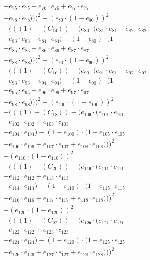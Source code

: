 \documentclass[10pt, a4paper]{article}
\begin{document}
\begin{align*}
& + e_{75} \cdot e_{75} + e_{76} \cdot e_{76} + e_{77} \cdot e_{77} \\
& + e_{78} \cdot e_{78})))^{2} + (e_{80} \cdot (1 - e_{80}))^{2} \\
& + (((1) - (C_{14})) - (e_{80} \cdot (e_{81} \cdot e_{81} + e_{82} \cdot e_{82} \\
& + e_{83} \cdot e_{83} + e_{84} \cdot e_{84}) - (1 - e_{80}) \cdot (1 \\
& + e_{85} \cdot e_{85} + e_{86} \cdot e_{86} + e_{87} \cdot e_{87} \\
& + e_{88} \cdot e_{88})))^{2} + (e_{90} \cdot (1 - e_{90}))^{2} \\
& + (((1) - (C_{16})) - (e_{90} \cdot (e_{91} \cdot e_{91} + e_{92} \cdot e_{92} \\
& + e_{93} \cdot e_{93} + e_{94} \cdot e_{94}) - (1 - e_{90}) \cdot (1 \\
& + e_{95} \cdot e_{95} + e_{96} \cdot e_{96} + e_{97} \cdot e_{97} \\
& + e_{98} \cdot e_{98})))^{2} + (e_{100} \cdot (1 - e_{100}))^{2} \\
& + (((1) - (C_{18})) - (e_{100} \cdot (e_{101} \cdot e_{101} \\
& + e_{102} \cdot e_{102} + e_{103} \cdot e_{103} \\
& + e_{104} \cdot e_{104}) - (1 - e_{100}) \cdot (1 + e_{105} \cdot e_{105} \\
& + e_{106} \cdot e_{106} + e_{107} \cdot e_{107} + e_{108} \cdot e_{108})))^{2} \\
& + (e_{110} \cdot (1 - e_{110}))^{2} \\
& + (((1) - (C_{20})) - (e_{110} \cdot (e_{111} \cdot e_{111} \\
& + e_{112} \cdot e_{112} + e_{113} \cdot e_{113} \\
& + e_{114} \cdot e_{114}) - (1 - e_{110}) \cdot (1 + e_{115} \cdot e_{115} \\
& + e_{116} \cdot e_{116} + e_{117} \cdot e_{117} + e_{118} \cdot e_{118})))^{2} \\
& + (e_{120} \cdot (1 - e_{120}))^{2} \\
& + (((1) - (C_{22})) - (e_{120} \cdot (e_{121} \cdot e_{121} \\
& + e_{122} \cdot e_{122} + e_{123} \cdot e_{123} \\
& + e_{124} \cdot e_{124}) - (1 - e_{120}) \cdot (1 + e_{125} \cdot e_{125} \\
& + e_{126} \cdot e_{126} + e_{127} \cdot e_{127} + e_{128} \cdot e_{128})))^{2} \\

\end{align*}
\end{document}
